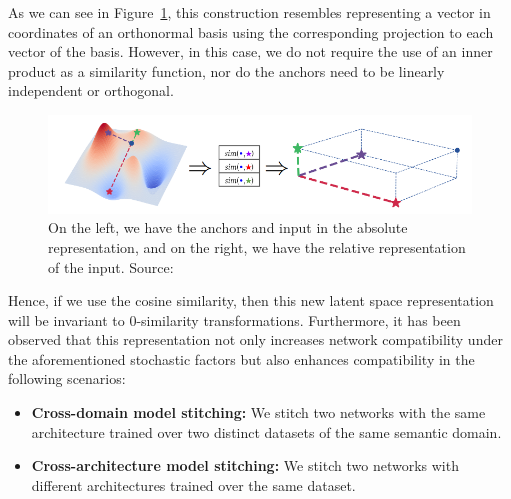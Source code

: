 \documentclass[../main.tex]{subfiles}
\begin{document}
\begin{remark}
As we can see in Figure~\ref{fig:relativeSche}, this construction resembles representing a vector in coordinates of an orthonormal basis using the corresponding projection to each vector of the basis. However, in this case, we do not require the use of an inner product as a similarity function, nor do the anchors need to be linearly independent or orthogonal.
\end{remark}

\begin{figure}[!ht]
    \centering
    \includegraphics[width=\textwidth]{figures/bg/relativeSche.png} 
    \caption{On the left, we have the anchors and input in the absolute representation, and on the right, we have the relative representation of the input. Source: \cite{moschella_relative_2022}}
    \label{fig:relativeSche}
\end{figure}

Hence, if we use the cosine similarity, then this new latent space representation will be invariant to $0$-similarity transformations. Furthermore, it has been observed that this representation not only increases network compatibility under the aforementioned stochastic factors but also enhances compatibility in the following scenarios:

\begin{itemize}
    \item \textbf{Cross-domain model stitching:} We stitch two networks with the same architecture trained over two distinct datasets of the same semantic domain.
    \item \textbf{Cross-architecture model stitching:} We stitch two networks with different architectures trained over the same dataset.
\end{itemize}
\end{document}
